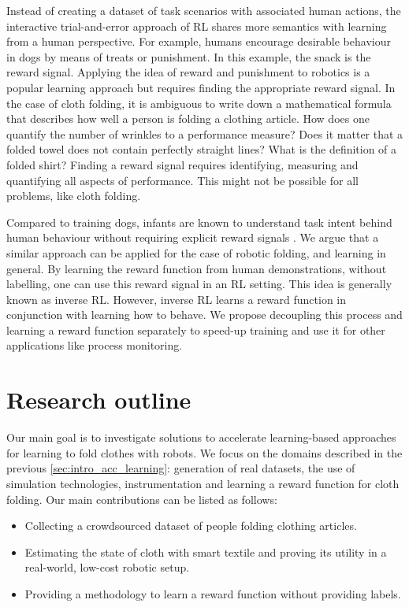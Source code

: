 \documentclass[\home/main.tex]{subfiles}
\begin{document}
Instead of creating a dataset of task scenarios with associated human actions, the interactive trial-and-error approach of \gls{RL} shares more semantics with learning from a human perspective. For example, humans encourage desirable behaviour in dogs by means of treats or punishment. In this example, the snack is the reward signal. Applying the idea of reward and punishment to robotics is a popular learning approach but requires finding the appropriate reward signal. In the case of cloth folding, it is ambiguous to write down a mathematical formula that describes how well a person is folding a clothing article. How does one quantify the number of wrinkles to a performance measure? Does it matter that a folded towel does not contain perfectly straight lines? What is the definition of a folded shirt? Finding a reward signal requires identifying, measuring and quantifying all aspects of performance. This might not be possible for all problems, like cloth folding.

Compared to training dogs, infants are known to understand task intent behind human behaviour without requiring explicit reward signals \autocite{warneken2006altruistic}.
We argue that a similar approach can be applied for the case of robotic folding, and learning in general. By learning the reward function from human demonstrations, without labelling, one can use this reward signal in an \gls{RL} setting. This idea is generally known as inverse \gls{RL}. However, inverse RL learns a reward function in conjunction with learning how to behave. We propose decoupling this process and learning a reward function separately to speed-up training and use it for other applications like process monitoring.

\section{Research outline}
Our main goal is to investigate solutions to accelerate learning-based approaches for learning to fold clothes with robots. We focus on the domains described in the previous \cref{sec:intro_acc_learning}: generation of real datasets, the use of simulation technologies, instrumentation and learning a reward function for cloth folding. Our main contributions can be listed as follows:
\begin{itemize}
    \item Collecting a crowdsourced dataset of people folding clothing articles.
    \item Estimating the state of cloth with smart textile and proving its utility in a real-world, low-cost robotic setup.
    \item Providing a methodology to learn a reward function without providing labels.
\end{itemize}
\end{document}

